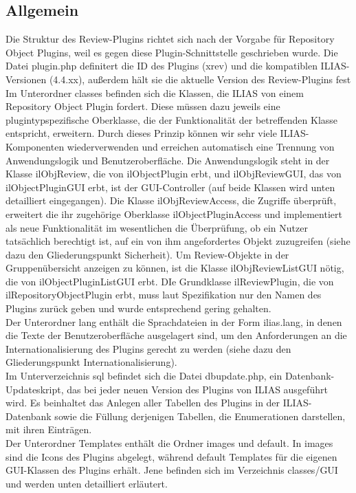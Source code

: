 \documentclass[a4paper]{scrreprt}
\begin{document}
\subsection{Allgemein}
Die Struktur des Review-Plugins richtet sich nach der Vorgabe für Repository Object Plugins, weil es gegen diese Plugin-Schnittstelle geschrieben wurde. Die Datei plugin.php definitert die ID des Plugins (xrev) und die kompatiblen ILIAS-Versionen (4.4.xx), außerdem hält sie die aktuelle Version des Review-Plugins fest\\
Im Unterordner classes befinden sich die Klassen, die ILIAS von einem Repository Object Plugin fordert. Diese müssen dazu jeweils eine plugintypspezifische Oberklasse, die der Funktionalität der betreffenden Klasse entspricht, erweitern. Durch dieses Prinzip können wir sehr viele ILIAS-Komponenten wiederverwenden und erreichen automatisch eine Trennung von Anwendungslogik und Benutzeroberfläche. Die Anwendungslogik steht in der Klasse ilObjReview, die von ilObjectPlugin erbt, und ilObjReviewGUI, das von ilObjectPluginGUI erbt, ist der GUI-Controller (auf beide Klassen wird unten detailliert eingegangen). Die Klasse ilObjReviewAccess, die Zugriffe überprüft, erweitert die ihr zugehörige Oberklasse ilObjectPluginAccess und implementiert als neue Funktionalität im wesentlichen die Überprüfung, ob ein Nutzer tatsächlich berechtigt ist, auf ein von ihm angefordertes Objekt zuzugreifen (siehe dazu den Gliederungspunkt Sicherheit). Um Review-Objekte in der Gruppenübersicht anzeigen zu können, ist die Klasse ilObjReviewListGUI nötig, die von ilObjectPluginListGUI erbt. DIe Grundklasse ilReviewPlugin, die von ilRepositoryObjectPlugin erbt, muss laut Spezifikation nur den Namen des Plugins zurück geben und wurde entsprechend gering gehalten.\\
Der Unterordner lang enthält die Sprachdateien in der Form ilias\textunderscore[Sprachkürzel].lang, in denen die Texte der Benutzeroberfläche ausgelagert sind, um den Anforderungen an die Internationalisierung des Plugins gerecht zu werden (siehe dazu den Gliederungspunkt Internationalisierung).\\
Im Unterverzeichnis sql befindet sich die Datei dbupdate.php, ein Datenbank-Updateskript, das bei jeder neuen Version des Plugins von ILIAS ausgeführt wird. Es beinhaltet das Anlegen aller Tabellen des Plugins in der ILIAS-Datenbank sowie die Füllung derjenigen Tabellen, die Enumerationen darstellen, mit ihren Einträgen.\\
Der Unterordner Templates enthält die Ordner images und default. In images sind die Icons des Plugins abgelegt, während default Templates für die eigenen GUI-Klassen des Plugins erhält. Jene befinden sich im Verzeichnis classes/GUI und werden unten detailliert erläutert.
\end{document}
